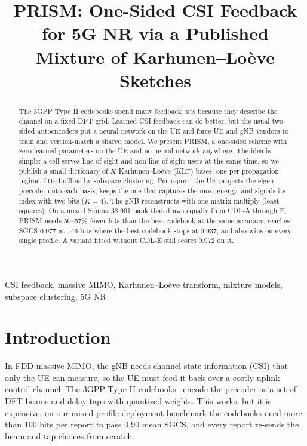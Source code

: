 \documentclass[conference]{IEEEtran}
\begin{document}
\title{PRISM: One-Sided CSI Feedback for 5G NR via a Published Mixture of Karhunen--Lo\`{e}ve Sketches}

\author{
}

\maketitle

\begin{abstract}
The 3GPP Type II codebooks spend many feedback bits because they describe the channel on a fixed DFT grid. Learned CSI feedback can do better, but the usual two-sided autoencoders put a neural network on the UE and force UE and gNB vendors to train and version-match a shared model. We present PRISM, a one-sided scheme with zero learned parameters on the UE and no neural network anywhere. The idea is simple: a cell serves line-of-sight and non-line-of-sight users at the same time, so we publish a small dictionary of $K$ Karhunen--Lo\`{e}ve (KLT) bases, one per propagation regime, fitted offline by subspace clustering. Per report, the UE projects the eigen-precoder onto each basis, keeps the one that captures the most energy, and signals its index with two bits ($K{=}4$). The gNB reconstructs with one matrix multiply (least squares). On a mixed Sionna 38.901 bank that draws equally from CDL-A through E, PRISM needs 50--57\% fewer bits than the best codebook at the same accuracy, reaches SGCS 0.977 at 146 bits where the best codebook stops at 0.937, and also wins on every single profile. A variant fitted without CDL-E still scores 0.972 on it.
\end{abstract}

\begin{IEEEkeywords}
CSI feedback, massive MIMO, Karhunen--Lo\`{e}ve transform, mixture models, subspace clustering, 5G NR
\end{IEEEkeywords}

\section{Introduction}
In FDD massive MIMO, the gNB needs channel state information (CSI) that only the UE can measure, so the UE must feed it back over a costly uplink control channel. The 3GPP Type II codebooks~\cite{3gpp38214} encode the precoder as a set of DFT beams and delay taps with quantized weights. This works, but it is expensive: on our mixed-profile deployment benchmark the codebooks need more than 100 bits per report to pass 0.90 mean SGCS, and every report re-sends the beam and tap choices from scratch.
\end{document}
